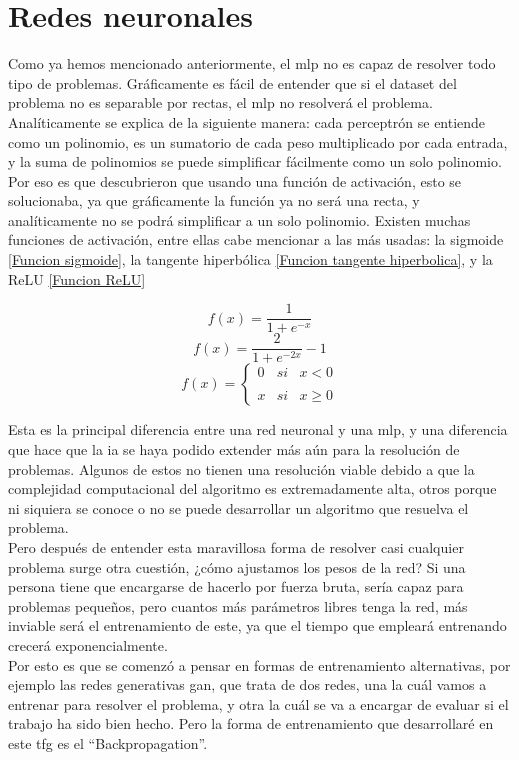 \section{Redes neuronales}
\label{Redes Neuronales}
Como ya hemos mencionado anteriormente, el \gls{mlp} no es capaz de resolver todo tipo de problemas. Gráficamente es fácil de entender que si el dataset del problema no es separable por rectas, el \gls{mlp} no resolverá el problema. Analíticamente se explica de la siguiente manera: cada perceptrón se entiende como un polinomio, es un sumatorio de cada peso multiplicado por cada entrada, y la suma de polinomios se puede simplificar fácilmente como un solo polinomio. Por eso es que descubrieron que usando una función de activación, esto se solucionaba, ya que gráficamente la función ya no será una recta, y analíticamente no se podrá simplificar a un solo polinomio.
Existen muchas funciones de activación, entre ellas cabe mencionar a las más usadas: la sigmoide \ref{Funcion sigmoide}, la tangente hiperbólica \ref{Funcion tangente hiperbolica}, y la ReLU \ref{Funcion ReLU}

\begin{equation}
	\label{Funcion sigmoide}
	f(x) =  \frac{\mathrm{1} }{\mathrm{1} + e^{-x} }
\end{equation}
\begin{equation}
	\label{Funcion tangente hiperbolica}
	f(x) =  \frac{\mathrm{2} }{\mathrm{1} + e^{-2x} }  - 1
\end{equation}
\begin{equation}
	\label{Funcion ReLU}
	f(x)= \left\{ \begin{array}{lcc}
		0 &   si  & x < 0 \\
		\\ x &  si  & x \geq 0
	\end{array}
	\right.
\end{equation}

Esta es la principal diferencia entre una red neuronal y una \gls{mlp}, y una diferencia que hace que la \gls{ia} se haya podido extender más aún para la resolución de problemas. Algunos de estos no tienen una resolución viable debido a que la complejidad computacional del algoritmo es extremadamente alta, otros porque ni siquiera se conoce o no se puede desarrollar un algoritmo que resuelva el problema. 
\\
Pero después de entender esta maravillosa forma de resolver casi cualquier problema surge otra cuestión, ¿cómo ajustamos los pesos de la red? Si una persona tiene que encargarse de hacerlo por fuerza bruta, sería capaz para problemas pequeños, pero cuantos más parámetros libres tenga la red, más inviable será el entrenamiento de este, ya que el tiempo que empleará entrenando crecerá exponencialmente.
\\
Por esto es que se comenzó a pensar en formas de entrenamiento alternativas, por ejemplo las redes generativas \gls{gan}, que trata de dos redes, una la cuál vamos a entrenar para resolver el problema, y otra la cuál se va a encargar de evaluar si el trabajo ha sido bien hecho. Pero la forma de entrenamiento que desarrollaré en este \gls{tfg} es el ``Backpropagation''.


